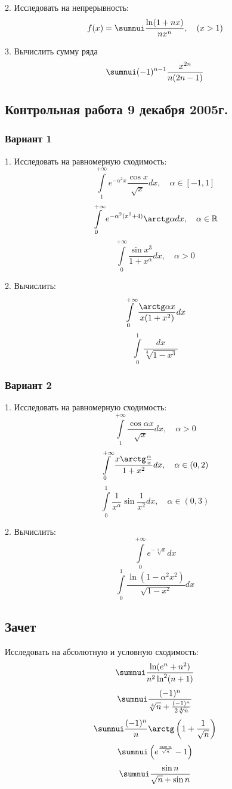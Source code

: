 \documentclass[a4paper]{article}
\begin{document}
2. Исследовать на непрерывность:
$$
f(x)=\sumnui \frac{\ln(1+nx)}{nx^n}, \quad (x>1)
$$

3. Вычислить сумму ряда
$$
\sumnui (-1)^{n-1}\frac{x^{2n}}{n(2n-1)}
$$

\subsection{Контрольная работа 9 декабря 2005г.}

\subsubsection{Вариант 1}

1. Исследовать на равномерную сходимость:
$$
\int\limits_1^{+\infty}e^{-\alpha^2x}\frac{\cos x}{\sqrt x}dx,
\quad \alpha\in [-1, 1]
$$
$$
\int\limits_0^{+\infty}e^{-\alpha^2(x^2+4)}\arctg \alpha dx,\quad
\alpha \in \mathbb{R}
$$
$$
\int\limits^{+\infty}_0\frac{\sin x^3}{1+x^\alpha}dx,\quad \alpha
>0
$$

2. Вычислить:
$$
\int\limits_0^{+\infty}\frac{\arctg \alpha x}{x(1+x^2)}dx
$$
$$
\int\limits_0^1\frac{dx}{\sqrt[3]{1-x^3}}
$$

\subsubsection{Вариант 2}

1. Исследовать на равномерную сходимость:
$$
\int\limits_1^{+\infty}\frac{\cos \alpha x}{\sqrt x}dx,\quad
\alpha >0
$$
$$
\int\limits_0^{+\infty}\frac{x\arctg
\frac{\alpha}{x}}{1+x^2}dx,\quad \alpha\in (0, 2)
$$
$$
\int\limits_0^1\frac{1}{x^\alpha}\sin\frac{1}{x^2}dx, \quad
\alpha\in (0, 3)
$$

2. Вычислить:
$$
\int\limits_0^{+\infty}e^{-\sqrt[3]{x}}dx
$$
$$
\int\limits_0^1\frac{\ln(1-\alpha ^2x^2)}{\sqrt{1-x^2}}dx
$$

\subsection{Зачет }

Исследовать на абсолютную и условную сходимость:
$$
\sumnui \frac{\ln (e^n+n^2)}{n^2\ln^2(n+1)}
$$
$$
\sumnui \frac{(-1)^n}{\sqrt[4]{n}+\frac{(-1)^n}{2\sqrt[4]{n}}}
$$
$$
\sumnui \frac{(-1)^n}{n}\arctg \left(1+\frac{1}{\sqrt{n}}\right)
$$
$$
\sumnui \left( e^\frac{\cos n}{\sqrt n}-1\right)
$$
$$
\sumnui \frac{\sin n}{\sqrt n +\sin n}
$$
\end{document}

